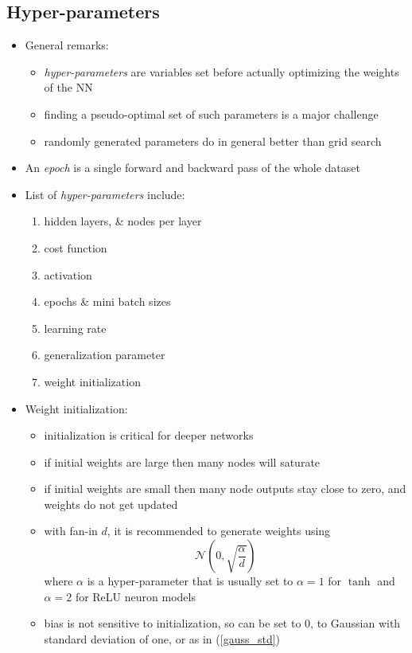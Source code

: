 \documentclass[onecolumn]{IEEEtran}
\newcommand{\beq}{\begin{equation}}
\newcommand{\eeq}{\end{equation}}
\newcommand{\bi}{\begin{itemize}}
\newcommand{\ei}{\end{itemize}}
\begin{document}
\subsection{Hyper-parameters}
\begin{itemize}
    \item General remarks:
    \bi
        \item \emph{hyper-parameters} are variables set before actually optimizing the weights of the NN
        \item finding a pseudo-optimal set of such parameters is a major challenge
        \item randomly generated parameters do in general better than grid search
    \ei
    \item An \emph{epoch} is a single forward and backward pass of the whole dataset
    \item List of \emph{hyper-parameters} include:
    \begin{enumerate}
            \item hidden layers, \& nodes per layer
            \item cost function
            \item activation
            \item epochs \& mini batch sizes
            \item learning rate
            \item generalization parameter
            \item weight initialization
    \end{enumerate}
    \item Weight initialization:
    \bi
        \item initialization is critical for deeper networks
        \item if initial weights are large then many nodes will saturate
        \item if initial weights are small then many node outputs stay close to zero, and weights do not get updated
        \item with fan-in $d$, it is recommended to generate weights using
        \beq\label{gauss_std}
            \mathcal{N}\left(0,\sqrt{\frac{\alpha}{d}}\right)
        \eeq
        where $\alpha$ is a hyper-parameter that is usually set to $\alpha = 1$ for $\tanh$ and $\alpha = 2$ for ReLU neuron models
        \item bias is not sensitive to initialization, so can be set to $0$, to Gaussian with standard deviation of one, or as in (\ref{gauss_std})
    \ei
\end{itemize}
\end{document}
